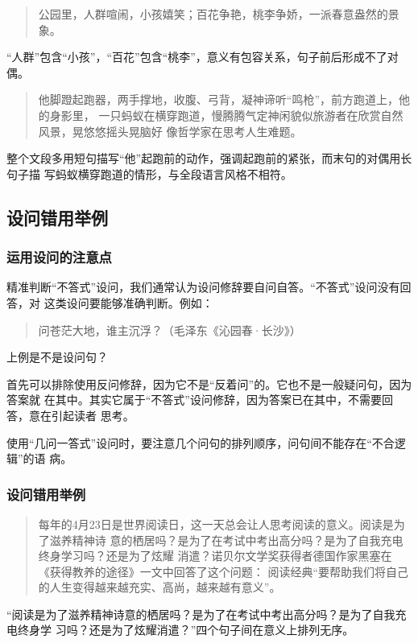 \documentclass[final,oneside]{ctexbook}
\newenvironment{equotation}{\begin{quotation}\kaishu}{\end{quotation}}
\begin{document}
\begin{equotation}
  公园里，人群喧闹，小孩嬉笑；百花争艳，桃李争娇，一派春意盎然的景象。
\end{equotation}
“人群”包含“小孩”，“百花”包含“桃李”，意义有包容关系，句子前后形成不了对偶。

\begin{equotation}
  他脚蹬起跑器，两手撑地，收腹、弓背，凝神谛听“鸣枪”，前方跑道上，他的身影里，
  一只蚂蚁在横穿跑道，慢腾腾气定神闲貌似旅游者在欣赏自然风景，晃悠悠摇头晃脑好
  像哲学家在思考人生难题。
\end{equotation}
整个文段多用短句描写“他”起跑前的动作，强调起跑前的紧张，而末句的对偶用长句子描
写蚂蚁横穿跑道的情形，与全段语言风格不相符。

\subsection{设问错用举例}

\subsubsection{运用设问的注意点}

精准判断“不答式”设问，我们通常认为设问修辞要自问自答。“不答式”设问没有回答，对
这类设问要能够准确判断。例如：

\begin{equotation}
  问苍茫大地，谁主沉浮？（毛泽东《沁园春·长沙》）
\end{equotation}
上例是不是设问句？

首先可以排除使用反问修辞，因为它不是“反着问”的。它也不是一般疑问句，因为答案就
在其中。其实它属于“不答式”设问修辞，因为答案已在其中，不需要回答，意在引起读者
思考。

使用“几问一答式”设问时，要注意几个问句的排列顺序，问句间不能存在“不合逻辑”的语
病。

\subsubsection{设问错用举例}

\begin{equotation}
  每年的4月23日是世界阅读日，这一天总会让人思考阅读的意义。阅读是为了滋养精神诗
  意的栖居吗？是为了在考试中考出高分吗？是为了自我充电终身学习吗？还是为了炫耀
  消遣？诺贝尔文学奖获得者德国作家黑塞在《获得教养的途径》一文中回答了这个问题：
  阅读经典“要帮助我们将自己的人生变得越来越充实、高尚，越来越有意义”。
\end{equotation}
“阅读是为了滋养精神诗意的栖居吗？是为了在考试中考出高分吗？是为了自我充电终身学
习吗？还是为了炫耀消遣？”四个句子间在意义上排列无序。
\end{document}
